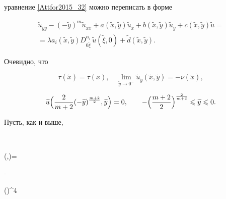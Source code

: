 уравнение \eqref{Attfor2015_32} можно переписать в форме

\begin{multline}

\label{Attfor2015_33}

\widetilde{u}_{\widetilde{y}\widetilde{y}}-

(-\widetilde{y})^m \widetilde{u}_{\widetilde{x}\widetilde{x}}+

a(\widetilde{x},\widetilde{y})\widetilde{u}_{\widetilde{x}}+

b(\widetilde{x},\widetilde{y})\widetilde{u}_{\widetilde{y}}+

c(\widetilde{x},\widetilde{y})\widetilde{u}=

\\

=\lambda a_i (\widetilde{x},\widetilde{y}) 

D_{0\widetilde{\xi}}^{\alpha_i}\, \widetilde{u}(\widetilde{\xi} , 0)+

\widetilde{d}(\widetilde{x},\widetilde{y}).

\end{multline}



Очевидно, что

\begin{equation}

\label{Attfor2015_34}

\tau(\widetilde{x})=\tau(x),\quad \lim\limits_{\widetilde{y}\rightarrow 0^-}

\widetilde{u}_{\widetilde{y}}(\widetilde{x},\widetilde{y})=-\nu(\widetilde{x}),

\end{equation}

$$

\widetilde{u} \Bigl(

\frac{2}{m+2} (-\widetilde{y})^{\frac{m+2}{2}},\widetilde{y} 

\Bigr)=0,

\qquad

-\Bigl(\frac{m+2}{2}\Bigr)^{\frac{2}{m+2}}\leqslant\widetilde{y}\leqslant 0.

$$

Пусть, как и выше,

$$

(\widetilde{\xi},\widetilde{\eta})=

- 

\Bigl(\Bigr)^{4\beta}

